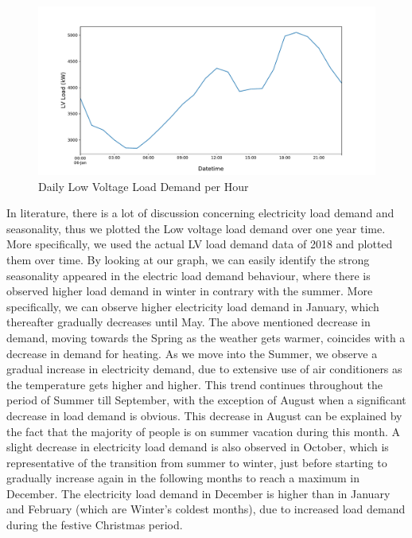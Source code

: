 \begin{figure}[ht!]
\centering
\includegraphics[width=1\linewidth]{project/eda4.pdf}

\caption{Daily Low Voltage Load Demand per Hour}
\end{figure}
\par In literature, there is a lot of discussion concerning electricity load demand and seasonality, thus we plotted the Low voltage load demand over one year time. More specifically, we used the actual LV load demand data of 2018 and plotted them over time. By looking at our graph, we can easily identify the strong seasonality appeared in the electric load demand behaviour, where there is observed higher load demand in winter in contrary with the summer. More specifically, we can observe higher electricity load demand in January, which thereafter gradually decreases until May. The above mentioned decrease in demand, moving towards the Spring as the weather gets warmer, coincides with a decrease in demand for heating.  As we move into the Summer, we observe a gradual increase in electricity demand, due to extensive use of air conditioners as the temperature gets higher and higher. This trend continues throughout the period of Summer till September, with the exception of August when a significant decrease in load demand is obvious. This decrease in August can be explained by the fact that the majority of people is on summer vacation during this month. A slight decrease in electricity load demand is also observed in October, which is representative of the transition from summer to winter, just before starting to gradually increase again in the following months to reach a maximum in December. The electricity load demand in December is higher than in January and February (which are Winter's coldest months), due to increased load demand during the festive Christmas period. 
